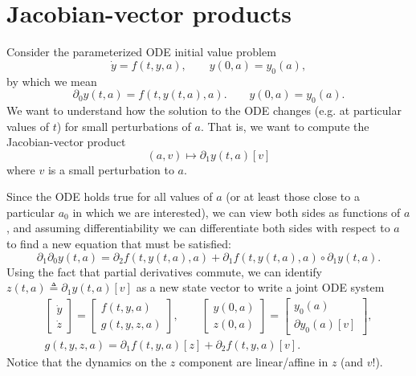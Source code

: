 \documentclass{article}
\begin{document}
\section{Jacobian-vector products}
Consider the parameterized ODE initial value problem
\begin{equation}
    \dot y = f(t, y, a), \qquad y(0, a) = y_0(a),
\end{equation}
by which we mean
\begin{equation}
    \partial_0 y(t, a) = f(t, y(t, a), a). \qquad y(0, a) = y_0(a).
\end{equation}
We want to understand how the solution to the ODE changes (e.g. at particular
values of $t$) for small perturbations of $a$. That is, we want to compute the
Jacobian-vector product
\begin{equation}
    (a, v) \mapsto \partial_1 y(t, a)[v]
\end{equation}
where $v$ is a small perturbation to $a$.

Since the ODE holds true for all values of $a$ (or at least those close to a
particular $a_0$ in which we are interested), we can view both sides as
functions of $a$, and assuming differentiability we can differentiate both
sides with respect to $a$ to find a new equation that must be satisfied:
\begin{equation}
    \partial_1 \partial_0 y(t, a) = \partial_2 f(t, y(t, a), a) + \partial_1 f(t, y(t, a), a) \circ \partial_1 y(t, a).
\end{equation}
Using the fact that partial derivatives commute, we can identify $z(t, a)
\triangleq \partial_1 y(t, a)[v]$ as a new state vector to write a joint ODE system
\begin{gather}
    \begin{bmatrix}
        \dot y \\
        \dot z
    \end{bmatrix}
    =
    \begin{bmatrix}
        f(t, y, a) \\
        g(t, y, z, a)
    \end{bmatrix},
    \qquad
    \begin{bmatrix}
        y(0, a) \\
        z(0, a)
    \end{bmatrix}
    =
    \begin{bmatrix}
        y_0(a) \\
        \partial y_0(a)[v]
    \end{bmatrix},
    \\
    g(t, y, z, a) = \partial_1 f(t, y, a)[z] + \partial_2 f(t, y, a)[v].
\end{gather}
Notice that the dynamics on the $z$ component are linear/affine in $z$ (and $v$!).
\end{document}

